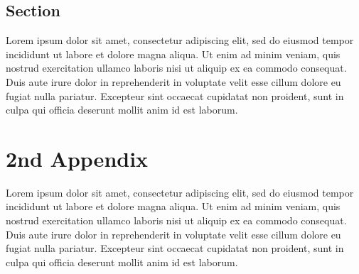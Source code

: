 \documentclass{sig-alternate-05-2015}
\begin{document}
\subsection{Section}
Lorem ipsum dolor sit amet, consectetur adipiscing elit, sed do eiusmod tempor incididunt ut labore et dolore magna aliqua. Ut enim ad minim veniam, quis nostrud exercitation ullamco laboris nisi ut aliquip ex ea commodo consequat. Duis aute irure dolor in reprehenderit in voluptate velit esse cillum dolore eu fugiat nulla pariatur. Excepteur sint occaecat cupidatat non proident, sunt in culpa qui officia deserunt mollit anim id est laborum.

\section{2nd Appendix}
Lorem ipsum dolor sit amet, consectetur adipiscing elit, sed do eiusmod tempor incididunt ut labore et dolore magna aliqua. Ut enim ad minim veniam, quis nostrud exercitation ullamco laboris nisi ut aliquip ex ea commodo consequat. Duis aute irure dolor in reprehenderit in voluptate velit esse cillum dolore eu fugiat nulla pariatur. Excepteur sint occaecat cupidatat non proident, sunt in culpa qui officia deserunt mollit anim id est laborum.
\end{document}
